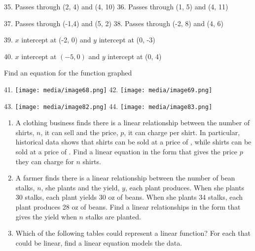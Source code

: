 \begin{enumerate}
35. Passes through (2, 4) and (4, 10) 36. Passes through (1, 5) and (4,
11)

37. Passes through (-1,4) and (5, 2) 38. Passes through (-2, 8) and (4,
6)

39. $x$ intercept at (-2, 0) and $y$ intercept at (0, -3)

40. $x$ intercept at $(-5, 0)$ and $y$ intercept at (0, 4)

Find an equation for the function graphed

41.
\texttt{[image: media/image68.png]}
42.
\texttt{[image: media/image69.png]}

43.
\texttt{[image: media/image82.png]}
44.
\texttt{[image: media/image83.png]}

\begin{enumerate}
\def\labelenumi{\arabic{enumi}.}
\setcounter{enumi}{44}
\item
  A clothing business finds there is a linear relationship between the
  number of shirts, $n$, it can sell and the price, $p$, it
  can charge per shirt. In particular, historical data shows that shirts
  can be sold at a price of , while shirts can be sold at a price of .
  Find a linear equation in the form that gives the price $p$ they
  can charge for $n$ shirts.
\item
  A farmer finds there is a linear relationship between the number of
  bean stalks, $n$, she plants and the yield, $y$, each plant
  produces. When she plants 30 stalks, each plant yields 30 oz of beans.
  When she plants 34 stalks, each plant produces 28 oz of beans. Find a
  linear relationships in the form that gives the yield when $n$
  stalks are planted.

\item
  Which of the following tables could represent a linear function? For
  each that could be linear, find a linear equation models the data.


\end{enumerate}
\end{enumerate}
